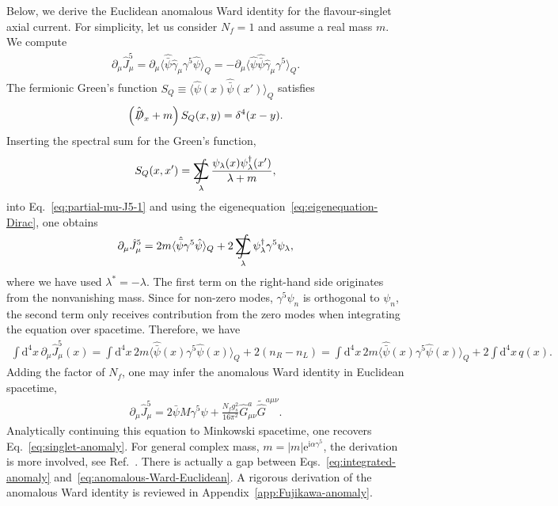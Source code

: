 \documentclass[review]{elsarticle}
\numberwithin{equation}{section}
\numberwithin{table}{section}
\numberwithin{figure}{section}
\DeclareMathOperator*{\SumInt}{%
\mathchoice%
  {\ooalign{$\displaystyle\sum$\cr\hidewidth$\displaystyle\int$\hidewidth\cr}}
  {\ooalign{\raisebox{.14\height}{\scalebox{.7}{$\textstyle\sum$}}\cr\hidewidth$\textstyle\int$\hidewidth\cr}}
  {\ooalign{\raisebox{.2\height}{\scalebox{.6}{$\scriptstyle\sum$}}\cr$\scriptstyle\int$\cr}}
  {\ooalign{\raisebox{.2\height}{\scalebox{.6}{$\scriptstyle\sum$}}\cr$\scriptstyle\int$\cr}}
}
\def\d{\mathrm{d}}
\def\i{\mathrm{i}}
\def\e{\mathrm{e}}
\begin{document}
Below, we derive the Euclidean anomalous Ward identity for the flavour-singlet axial current. For simplicity, let us consider $N_f=1$ and assume a real mass $m$. We compute
\begin{align}
    \partial_\mu \hat{J}_\mu^5 
    = 
    \partial_\mu \langle \hat{\bar\psi}\hat{\gamma}_\mu \gamma^5 \hat\psi\rangle_Q
    = 
    -\partial_\mu \langle \hat\psi\hat{\bar\psi}\hat{\gamma}_\mu \gamma^5\rangle_Q.
    \label{eq:partial-mu-J5-1}
\end{align}
The fermionic Green's function $S_Q\equiv \langle \hat\psi(x) \hat{\bar\psi}(x')\rangle_Q$ satisfies
\begin{align}
   \left(\hat{\slashed{D}}_x+m\right) S_Q(x,y) = \delta^4(x-y).
\end{align}
Inserting the spectral sum for the Green's function,
\begin{align}
    S_Q(x,x')= \SumInt_\lambda\frac{\psi_\lambda(x)\psi_\lambda^\dagger(x') }{\lambda+m},
\end{align}
into Eq.~\eqref{eq:partial-mu-J5-1} and using the eigenequation~\eqref{eq:eigenequation-Dirac}, one obtains
\begin{align}
    \partial_\mu \hat{J}_\mu^5 = 2m \langle \hat{\bar\psi}\gamma^5 \hat\psi\rangle_Q + 2 \SumInt_\lambda \psi_\lambda^\dagger \gamma^5 \psi_\lambda,
\end{align}
where we have used $\lambda^*=-\lambda$. The first term on the right-hand side originates from the nonvanishing mass. Since for non-zero modes, $\gamma^5\psi_n$ is orthogonal to $\psi_n$, the second term only receives contribution from the zero modes when integrating the equation over spacetime. Therefore, we have 
\begin{align}
    \int \d^4 x\,\partial_\mu \hat{J}^5_\mu(x) = \int\d^4 x\, 2m\langle \hat{\bar{\psi}}(x) \gamma^5 \hat{\psi}(x)\rangle_Q + 2(n_R-n_L)=\int\d^4 x\, 2m\langle \hat{\bar{\psi}}(x) \gamma^5 \hat{\psi}(x)\rangle_Q + 2\int \d^4x\, q(x).
    \label{eq:integrated-anomaly}
\end{align}
Adding the factor of $N_f$, one may infer the anomalous Ward identity in Euclidean spacetime,
\begin{align}
    \partial_\mu\hat{J}^5_\mu = 2\bar\psi M\gamma^5 \psi +\frac{N_f g_s^2}{16\pi^2} \hat{G}^a_{\mu\nu}\widetilde{\hat{G}}^{a\mu\nu}.
    \label{eq:anomalous-Ward-Euclidean}
\end{align}
Analytically continuing this equation to Minkowski spacetime, one recovers Eq.~\eqref{eq:singlet-anomaly}. For general complex mass, $m=|m|\e^{\i\alpha\gamma^5}$, the derivation is more involved, see Ref.~\cite{Ai:2020ptm}. There is actually a gap between Eqs.~\eqref{eq:integrated-anomaly} and~\eqref{eq:anomalous-Ward-Euclidean}.  A rigorous derivation of the anomalous Ward identity is reviewed in Appendix~\ref{app:Fujikawa-anomaly}.
\end{document}
